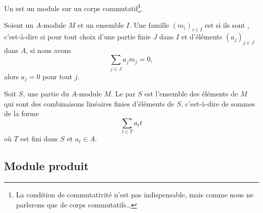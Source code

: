 \begin{definition}\label{DEFooKHWZooIfxdNc}
    Un  est un module sur un corps commutatif\footnote{La condition de commutativité n'est pas indispensable, mais comme nous ne parlerons que de corps commutatifs\ldots}.
\end{definition}

\begin{definition}        \label{DEFooRUKVooLnXxdS}
    Soient un \( A\)-module \( M\) et un ensemble \( I\). Une famille \( (m_i)_{i\in I}\) est  si ils sont , c'est-à-dire si pour tout choix d'une partie finie \( J\) dans \( I\) et d'éléments \( (a_j)_{j\in J}\) dans \( A\), si nous avons
    \begin{equation}
        \sum_{j\in J}a_jm_j=0,
    \end{equation}
    alors \( a_j=0\) pour tout \( j\).
\end{definition}

\begin{definition}        \label{DEFooWBOBooJNyyBF}
    Soit \( S\), une partie du \( A\)-module \( M\). Le  par \( S\) est l'ensemble des éléments de \( M\) qui sont des combinaisons linéaires finies d'éléments de \( S\), c'est-à-dire de sommes de la forme
    \begin{equation}
        \sum_{t\in T}a_tt
    \end{equation}
    où \( T\) est fini dans \( S\) et \( a_t\in A\).
\end{definition}

\subsection{Module produit}

